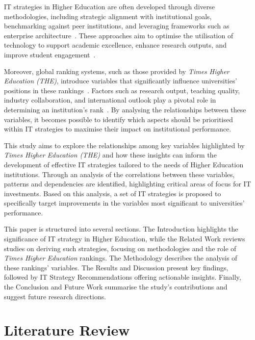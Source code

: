 \documentclass[conference]{IEEEtran}
\begin{document}
IT strategies in Higher Education are often developed through diverse methodologies, including strategic alignment with institutional goals, benchmarking against peer institutions, and leveraging frameworks such as enterprise architecture~\cite{bianchi2023it}. These approaches aim to optimise the utilisation of technology to support academic excellence, enhance research outputs, and improve student engagement~\cite{digitalsystems2022strategy}.

Moreover, global ranking systems, such as those provided by \textit{Times Higher Education (THE)}, introduce variables that significantly influence universities' positions in these rankings~\cite{times2023methodology}. Factors such as research output, teaching quality, industry collaboration, and international outlook play a pivotal role in determining an institution’s rank~\cite{times2022rankings}. By analysing the relationships between these variables, it becomes possible to identify which aspects should be prioritised within IT strategies to maximise their impact on institutional performance.


This study aims to explore the relationships among key variables highlighted by \textit{Times Higher Education (THE)} and how these insights can inform the development of effective IT strategies tailored to the needs of Higher Education institutions. Through an analysis of the correlations between these variables, patterns and dependencies are identified, highlighting critical areas of focus for IT investments. Based on this analysis, a set of IT strategies is proposed to specifically target improvements in the variables most significant to universities' performance.

This paper is structured into several sections. The Introduction highlights the significance of IT strategy in Higher Education, while the Related Work reviews studies on deriving such strategies, focusing on methodologies and the role of \textit{Times Higher Education} rankings. The Methodology describes the analysis of these rankings' variables. The Results and Discussion present key findings, followed by IT Strategy Recommendations offering actionable insights. Finally, the Conclusion and Future Work summarise the study's contributions and suggest future research directions.


\section{Literature Review}
\label{sec:literature_review}
\end{document}
